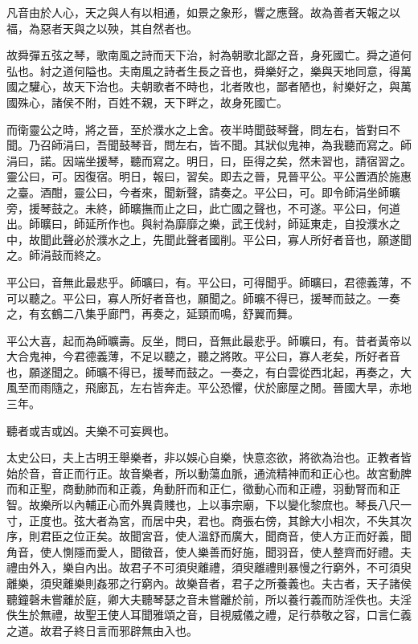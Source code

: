 凡音由於人心，天之與人有以相通，如景之象形，響之應聲。故為善者天報之以福，為惡者天與之以殃，其自然者也。

故舜彈五弦之琴，歌南風之詩而天下治，紂為朝歌北鄙之音，身死國亡。舜之道何弘也。紂之道何隘也。夫南風之詩者生長之音也，舜樂好之，樂與天地同意，得萬國之驩心，故天下治也。夫朝歌者不時也，北者敗也，鄙者陋也，紂樂好之，與萬國殊心，諸侯不附，百姓不親，天下畔之，故身死國亡。

而衛靈公之時，將之晉，至於濮水之上舍。夜半時聞鼓琴聲，問左右，皆對曰不聞。乃召師涓曰，吾聞鼓琴音，問左右，皆不聞。其狀似鬼神，為我聽而寫之。師涓曰，諾。因端坐援琴，聽而寫之。明日，曰，臣得之矣，然未習也，請宿習之。靈公曰，可。因復宿。明日，報曰，習矣。即去之晉，見晉平公。平公置酒於施惠之臺。酒酣，靈公曰，今者來，聞新聲，請奏之。平公曰，可。即令師涓坐師曠旁，援琴鼓之。未終，師曠撫而止之曰，此亡國之聲也，不可遂。平公曰，何道出。師曠曰，師延所作也。與紂為靡靡之樂，武王伐紂，師延東走，自投濮水之中，故聞此聲必於濮水之上，先聞此聲者國削。平公曰，寡人所好者音也，願遂聞之。師涓鼓而終之。

平公曰，音無此最悲乎。師曠曰，有。平公曰，可得聞乎。師曠曰，君德義薄，不可以聽之。平公曰，寡人所好者音也，願聞之。師曠不得已，援琴而鼓之。一奏之，有玄鶴二八集乎廊門，再奏之，延頸而鳴，舒翼而舞。

平公大喜，起而為師曠壽。反坐，問曰，音無此最悲乎。師曠曰，有。昔者黃帝以大合鬼神，今君德義薄，不足以聽之，聽之將敗。平公曰，寡人老矣，所好者音也，願遂聞之。師曠不得已，援琴而鼓之。一奏之，有白雲從西北起，再奏之，大風至而雨隨之，飛廊瓦，左右皆奔走。平公恐懼，伏於廊屋之閒。晉國大旱，赤地三年。

聽者或吉或凶。夫樂不可妄興也。

太史公曰，夫上古明王舉樂者，非以娛心自樂，快意恣欲，將欲為治也。正教者皆始於音，音正而行正。故音樂者，所以動蕩血脈，通流精神而和正心也。故宮動脾而和正聖，商動肺而和正義，角動肝而和正仁，徵動心而和正禮，羽動腎而和正智。故樂所以內輔正心而外異貴賤也，上以事宗廟，下以變化黎庶也。琴長八尺一寸，正度也。弦大者為宮，而居中央，君也。商張右傍，其餘大小相次，不失其次序，則君臣之位正矣。故聞宮音，使人溫舒而廣大，聞商音，使人方正而好義，聞角音，使人惻隱而愛人，聞徵音，使人樂善而好施，聞羽音，使人整齊而好禮。夫禮由外入，樂自內出。故君子不可須臾離禮，須臾離禮則暴慢之行窮外，不可須臾離樂，須臾離樂則姦邪之行窮內。故樂音者，君子之所養義也。夫古者，天子諸侯聽鐘磬未嘗離於庭，卿大夫聽琴瑟之音未嘗離於前，所以養行義而防淫佚也。夫淫佚生於無禮，故聖王使人耳聞雅頌之音，目視威儀之禮，足行恭敬之容，口言仁義之道。故君子終日言而邪辟無由入也。